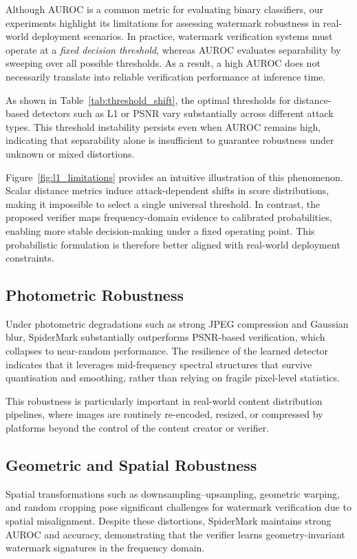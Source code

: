 Although AUROC is a common metric for evaluating binary classifiers, our experiments highlight its limitations for assessing watermark robustness in real-world deployment scenarios. In practice, watermark verification systems must operate at a \emph{fixed decision threshold}, whereas AUROC evaluates separability by sweeping over all possible thresholds. As a result, a high AUROC does not necessarily translate into reliable verification performance at inference time.

As shown in Table~\ref{tab:threshold_shift}, the optimal thresholds for distance-based detectors such as L1 or PSNR vary substantially across different attack types. This threshold instability persists even when AUROC remains high, indicating that separability alone is insufficient to guarantee robustness under unknown or mixed distortions.

Figure~\ref{fig:l1_limitations} provides an intuitive illustration of this phenomenon. Scalar distance metrics induce attack-dependent shifts in score distributions, making it impossible to select a single universal threshold. In contrast, the proposed verifier maps frequency-domain evidence to calibrated probabilities, enabling more stable decision-making under a fixed operating point. This probabilistic formulation is therefore better aligned with real-world deployment constraints.

\subsection{Photometric Robustness}

Under photometric degradations such as strong JPEG compression and Gaussian blur, SpiderMark substantially outperforms PSNR-based verification, which collapses to near-random performance. The resilience of the learned detector indicates that it leverages mid-frequency spectral structures that survive quantisation and smoothing, rather than relying on fragile pixel-level statistics.

This robustness is particularly important in real-world content distribution pipelines, where images are routinely re-encoded, resized, or compressed by platforms beyond the control of the content creator or verifier.

\subsection{Geometric and Spatial Robustness}

Spatial transformations such as downsampling–upsampling, geometric warping, and random cropping pose significant challenges for watermark verification due to spatial misalignment. Despite these distortions, SpiderMark maintains strong AUROC and accuracy, demonstrating that the verifier learns geometry-invariant watermark signatures in the frequency domain.

